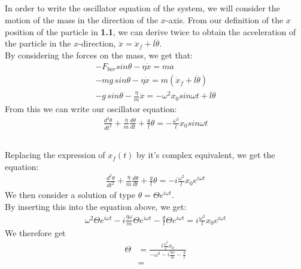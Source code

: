\documentclass{article}
\begin{document}
\subsection{} %

In order to write the oscillator equation of the system, we will consider the motion of the mass in the direction of the $x$-axis. From our definition of the $x$ position of the particle in \textbf{1.1}, we can derive twice to obtain the acceleration of the particle in the $x$-direction, $\ddot{x} = \ddot{x}_f + l \ddot{\theta}$.\\

\noindent By considering the forces on the mass, we get that:
\begin{align*}
	-F_{bar}sin\theta - \eta \dot{x} = ma\\
	-mg\,sin\theta - \eta \dot{x} = m( \ddot{x}_f + l \ddot{\theta})\\
	-g\,sin\theta - \frac{\eta}{m} \dot{x} = -\omega^2x_0sin \omega t + l \ddot{\theta}
\end{align*}
From this we can write our oscillator equation:
\begin{align*}
	 \frac{d^2 \theta}{dt^2} + \frac{\eta}{m}\frac{d \theta}{dt} + \frac{g}{l}\theta  = -\frac{\omega^2}{l}x_0sin\omega t 
\end{align*}

\subsection{} %

Replacing the expression of $x_f(t)$ by it's complex equivalent, we get the equation:
\begin{align*}
	\frac{d^2 \theta}{dt^2} + \frac{\eta}{m}\frac{d \theta}{dt} + \frac{g}{l}\theta  = -i\frac{\omega^2}{l}x_0e^{i \omega t} 
\end{align*}
We then consider a solution of  type $\theta = \Theta e^{i \omega t}$.\\
By inserting this into the equation above, we get:
\begin{align*}
	\omega^2\Theta e^{i \omega t} - i\frac{\eta \omega}{m}\Theta e^{i \omega t} - \frac{g}{l}\Theta e^{i \omega t} = i\frac{\omega^2}{l}x_0e^{i \omega t}
\end{align*}
We therefore get
\begin{align*}
	\Theta &= \frac{i \frac{\omega^2}{l}x_0}{-\omega^2 - i\frac{\eta \omega}{m} - \frac{g}{l}}\\
	&=
\end{align*}
\end{document}
